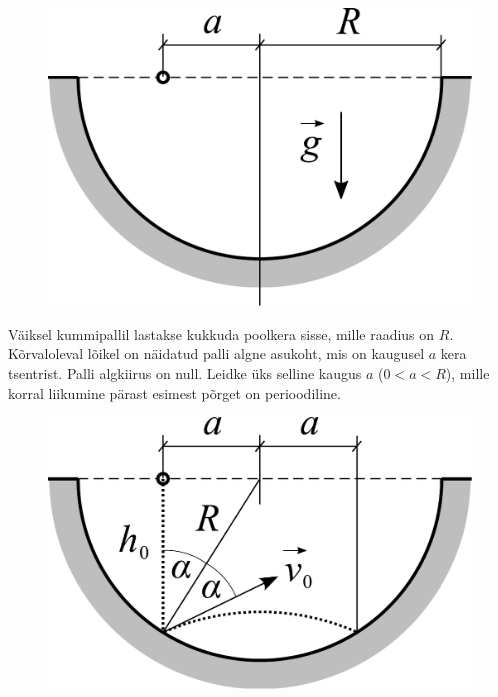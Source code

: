 
\begin{figure}
\vspace{-25pt}
  \begin{center}
    \includegraphics[width=\linewidth]{2024-v2g-10-yl.pdf}
  \end{center}
  \vspace{-1cm}
\end{figure}

Väiksel kummipallil lastakse kukkuda poolkera sisse, mille raadius on $R$. Kõrvaloleval lõikel on näidatud palli algne asukoht, mis on kaugusel $a$ kera tsentrist. Palli algkiirus on null. Leidke üks selline kaugus $a$ ($0<a<R$), mille korral liikumine pärast esimest põrget on perioodiline.


\hint

\solu
\begin{figure}
\vspace{-1.1cm}
  \begin{center}
    \includegraphics[width=1\linewidth]{2024-v2g-10-sol1.pdf}
  \end{center}
  \vspace{-1cm}
\end{figure}

